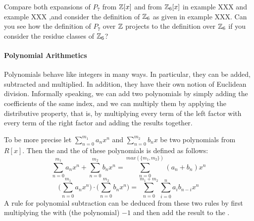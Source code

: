 \begin{exercise}
Compare both expansions of $P_7$ from $\mathbb{Z}[x]$ and from $\mathbb{Z}_6[x]$ in example XXX and example XXX ,and consider the definition of $\mathbb{Z}_6$ as given in example XXX. Can you see how the definition of $P_7$ over $\mathbb{Z}$ projects to the definition over $\mathbb{Z}_6$ if you consider the residue classes of $\mathbb{Z}_6$?
\end{exercise}
\paragraph{Polynomial Arithmetics}
Polynomials behave like integers in many ways. In particular, they can be added, subtracted and multiplied. In addition, they have their own notion of Euclidean division. Informally speaking, we can add two polynomials  by simply adding the coefficients of the same index, and we can multiply them by applying the distributive property, that is, by multiplying every term of the left factor with every term of the right factor and adding the results together.

To be more precise let $ \sum _{n = 0} ^{m_1}{a} _{n}{x} ^{n} $ and
$ \sum _{n = 0} ^{m_2}{b} _{n}{x} $ be two polynomials from $ R[x]$. Then the  and the  of these polynomials is defined as follows:
\begin{equation}
\sum _{n = 0} ^{m_1}{a} _{n}{x} ^{n} + \sum _{n = 0} ^{m_2}{b} _{n}{x } ^{n} = \sum _{n = 0} ^{max(\{m_1,m_2\})}{({a} _{n} +{b} _{n})}{x} ^{n}
\end{equation}
\begin{equation}
\bigg (\sum _{n = 0} ^{m_1}{a} _{n}{x} ^{n} \bigg) \cdot \bigg (\sum _{n = 0} ^{m_2 }{b} _{n}{x} ^{n} \bigg) = \sum _{n = 0} ^{m_1+m_2} \sum _{i = 0} ^{n}{a} _{i }{{b} _{n-i}}{x} ^{n}
\end{equation}
A rule for polynomial subtraction can be deduced from these two rules by first multiplying the \href{https://www.splashlearn.com/math-vocabulary/subtraction/subtrahend}{} 
with (the polynomial) $-1$ and then add the result to the \href{https://www.splashlearn.com/math-vocabulary/subtraction/minuend}{}.

